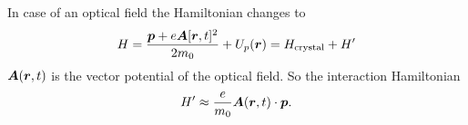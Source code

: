 In case of an optical field the Hamiltonian changes to
\begin{equation*}
	H = \frac{\mbox{\boldmath $p$} + e \mbox{\boldmath $A$}[\mbox{\boldmath $r$}, t]^2}{2 m_0} + U_p(\mbox{\boldmath $r$}) = H_\text{crystal} + H'
\end{equation*}
$\mbox{\boldmath $A$}(\mbox{\boldmath $r$},t)$ is the vector potential of the optical field. So the interaction Hamiltonian 
\begin{equation*}
	H' \approx \frac{e}{m_0} \mbox{\boldmath $A$}(\mbox{\boldmath $r$},t) \cdot \mbox{\boldmath $p$}.
\end{equation*}